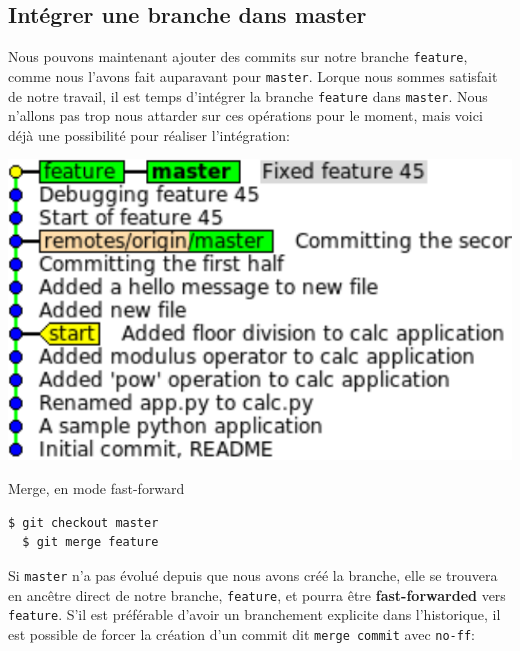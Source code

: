 \documentclass{../../common/tufte-latex/tufte-handout}
\begin{document}
\subsection{Intégrer une branche dans master}

Nous pouvons maintenant ajouter des commits sur notre branche \texttt{feature}, comme nous l'avons fait auparavant pour \texttt{master}.
Lorque nous sommes satisfait de notre travail, il est temps d'intégrer la branche \texttt{feature} dans \texttt{master}.
Nous n'allons pas trop nous attarder sur ces opérations pour le moment, mais voici déjà une possibilité pour réaliser l'intégration:

\begin{marginfigure}%
  \centering
  \includegraphics[width=\linewidth]{gitmerge-ff.pdf}
  \label{fig:gitmerge-ff}
  \caption{Merge, en mode fast-forward}
\end{marginfigure}

\begin{lstlisting}[style=BashInputStyle]
  $ git checkout master
  $ git merge feature
\end{lstlisting}

Si \texttt{master} n'a pas évolué depuis que nous avons créé la branche, elle se trouvera en ancêtre direct de notre branche, \texttt{feature}, et pourra être \textbf{fast-forwarded} vers \texttt{feature}.
S'il est préférable d'avoir un branchement explicite dans l'historique, il est possible de forcer la création d'un commit dit \texttt{merge commit} avec \texttt{no-ff}:
\end{document}
